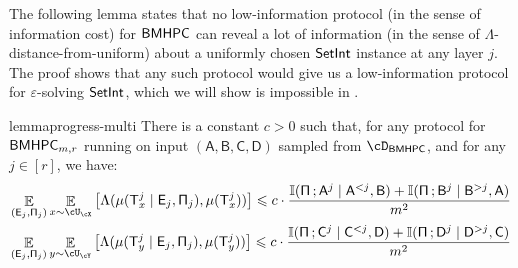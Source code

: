 \documentclass[11pt,letterpaper]{article}
\newcommand{\eps}{\varepsilon}
\DeclareMathOperator*{\E}{\mathbb{E}}
\renewcommand{\leq}{\leqslant}
\theoremstyle{definition}
\newcommand{\rPi}{\rv{\Pi}}
\newcommand{\bmhpc}{\ensuremath{\textnormal{\textsf{BMHPC}}}\xspace}
\newcommand{\setint}{\ensuremath{\textnormal{\textsf{SetInt}}}\xspace}
\newcommand{\rA}{\rv{A}}
\newcommand{\rB}{\rv{B}}
\newcommand{\rC}{\rv{C}}
\newcommand{\rD}{\rv{D}}
\newcommand{\rv}[1]{\ensuremath{\mathsf{#1}}}
\newcommand{\II}{\ensuremath{\mathbb{I}}}
\newcommand{\mi}[2]{\ensuremath{\II(#1 \,; #2)}}
\newcommand{\rT}{\rv{T}}
\newcommand{\rE}{\rv{E}}
\begin{document}
\bigskip\noindent
The following lemma states that no low-information protocol (in the sense of information cost) for $\bmhpc$ can reveal a lot of information (in the sense of $\Lambda$-distance-from-uniform) about a uniformly chosen $\setint$ instance at any layer $j$. The proof shows that any such protocol would give us a low-information protocol for $\eps$-solving $\setint$, which we will show is impossible in .

\begin{restatable}%
{lemma}{progress-multi} \label{lem:progress}
There is a constant $c > 0$ such that, for any protocol for $\bmhpc_{m,r}$
running on input $(\rA,\rB,\rC,\rD)$ sampled from $\cD_{\bmhpc}$, and for any
$j \in [r]$, we have:
\begin{align*}
\E_{(\rE_j, \rPi_j)}\E_{x \sim \cU_\cX}\left[\Lambda(\mu(\rT^j_x \mid \rE_j,
\rPi_j), \mu(\rT^j_x))\right] 
%
\leq  
%
c \cdot \frac{\mi{\rPi}{\rA^j \mid \rA^{< j}, \rB} + \mi{\rPi}{\rB^j \mid \rB^{> j}, \rA}}{m^2}\\
\E_{(\rE_j, \rPi_j)}\E_{y \sim \cU_\cY}\left[\Lambda(\mu(\rT^j_y \mid \rE_j,
\rPi_j), \mu(\rT^j_y))\right] 
%
\leq  
%
c \cdot \frac{\mi{\rPi}{\rC^j \mid \rC^{< j}, \rD} + \mi{\rPi}{\rD^j \mid \rD^{> j}, \rC}}{m^2}\\
\end{align*}
\end{restatable}
\end{document}
